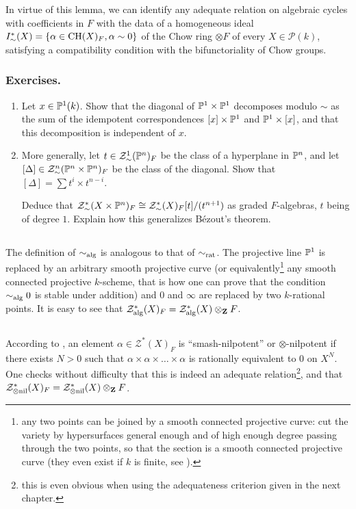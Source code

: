 \documentclass[../main.tex]{subfiles}
\begin{document}
In virtue of this lemma, we can identify any adequate relation on algebraic cycles with coefficients in $F$ with the data of a homogeneous ideal $I^*_{\sim}(X) = \{\alpha \in \CH(X)_F, \alpha \sim 0\}$ of the Chow ring $\otimes F$ of every $X \in \mathcal{P}(k)$, satisfying a compatibility condition with the bifunctoriality of Chow groups.

\subsubsection{Exercises.}
\begin{enumerate}[label=\arabic*)]
    \item Let $x \in \P^1(k)$. Show that the diagonal of $\P^1 \times \P^1$ decomposes modulo $\sim$ as the sum of the idempotent correspondences $[x] \times \P^1$ and $\P^1 \times [x]$, and that this decomposition is independent of $x$.
    \item More generally, let $t \in \mathcal{Z}^1_{\sim}(\P^n)_F$ be the class of a hyperplane in $\P^n$, and let $[\Delta] \in \mathcal{Z}^n_{\sim}(\P^n \times \P^n)_F$ be the class of the diagonal.
    Show that $[\Delta] = \sum t^i \times t^{n-i}$.

    Deduce that $\mathcal{Z}^*_{\sim}(X \times \P^n)_F \cong \mathcal{Z}^*_{\sim}(X)_F[t]/(t^{n+1})$ as graded $F$-algebras, $t$ being of degree $1$. Explain how this generalizes Bézout's theorem.
\end{enumerate}

\subsection{} The definition of $\sim_{\alg}$ is analogous to that of $\sim_{\rat}$.
The projective line $\P^1$ is replaced by an arbitrary smooth projective curve (or equivalently\footnote{any two points can be joined by a smooth connected projective curve: cut the variety by hypersurfaces general enough and of high enough degree passing through the two points, so that the section is a smooth connected projective curve (they even exist if $k$ is finite, see \cite{poonen}).} any smooth connected projective $k$-scheme, that is how one can prove that the condition $\sim_{\alg} 0$ is stable under addition) and $0$ and $\infty$ are replaced by two $k$-rational points.
It is easy to see that $\mathcal{Z}^*_{\alg}(X)_F = \mathcal{Z}^*_{\alg}(X) \otimes_{\Z} F$.

\subsection{} According to \cite{voevodsky95}, an element $\alpha \in \mathcal{Z}^*(X)_F$ is \enquote{smash-nilpotent} or $\otimes$-nilpotent if there exists $N > 0$ such that $\alpha \times \alpha \times \dots \times \alpha$ is rationally equivalent to $0$ on $X^N$.
One checks without difficulty that this is indeed an adequate relation\footnote{this is even obvious when using the adequateness criterion given in the next chapter.}, and that $\mathcal{Z}^*_{\otimes\nil}(X)_F = \mathcal{Z}^*_{\otimes\nil}(X) \otimes_{\Z} F$.
\end{document}
